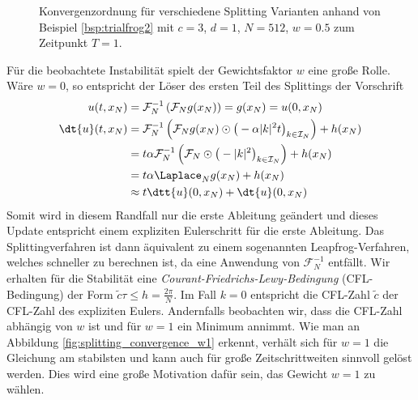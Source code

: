 \begin{mathbsp}
\begin{figure}[!htb]
\caption{Konvergenzordnung für verschiedene Splitting Varianten anhand von Beispiel \ref{bsp:trialfrog2} mit $c=3$, $d=1$, $N=512$, $w=0.5$ zum Zeitpunkt $T=1$.}
\label{fig:splitting_convergence}
\end{figure}
Für die beobachtete Instabilität spielt der Gewichtsfaktor $w$ eine große Rolle. Wäre $w=0$, so entspricht der Löser des ersten Teil des Splittings der Vorschrift
\begin{align*}
u(t,x_N)&=\mathcal{F}_N^{-1}\left(\mathcal{F}_Ng(x_N)\right)=g(x_N)=u(0,x_N)\\
\dt{u}(t,x_N)&=\mathcal{F}_N^{-1}\left(\mathcal{F}_Ng(x_N)\odot \big(-\alpha |k|^2t\big)_{k\in\mathcal{I}_N}\right)+h(x_N)\\
&=t \alpha \mathcal{F}_N^{-1}\left(\mathcal{F}_N\odot \big(-|k|^2\big)_{k\in\mathcal{I}_N}\right)+h(x_N)\\
&=t\alpha \Laplace_N g(x_N)+h(x_N)\\
&\approx t\dtt{u}(0,x_N)+\dt{u}(0,x_N)
\end{align*}
Somit wird in diesem Randfall nur die erste Ableitung geändert und dieses Update entspricht einem expliziten Eulerschritt für die erste Ableitung. Das Splittingverfahren ist dann äquivalent zu einem sogenannten Leapfrog-Verfahren, welches schneller zu berechnen ist, da eine Anwendung von $\mathcal{F}_N^{-1}$ entfällt. Wir erhalten für die Stabilität eine \emph{Courant-Friedrichs-Lewy-Bedingung} (CFL-Bedingung) der Form $\tilde{c}\tau\le h=\frac{2\pi}{N}$. Im Fall $k=0$ entspricht die CFL-Zahl $\tilde{c}$ der CFL-Zahl des expliziten Eulers. Andernfalls beobachten wir, dass die CFL-Zahl abhängig von $w$ ist und für $w=1$ ein Minimum annimmt. Wie man an Abbildung \ref{fig:splitting_convergence_w1} erkennt, verhält sich für $w=1$ die Gleichung am stabilsten und kann auch für große Zeitschrittweiten sinnvoll gelöst werden. Dies wird eine große Motivation dafür sein, das Gewicht $w=1$ zu wählen.


\end{mathbsp}
